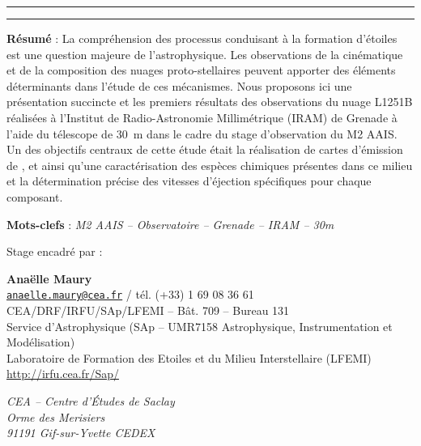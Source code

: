 \documentclass[a4paper,10pt,french]{article}
\begin{document}
\begin{center}

    \vspace{1.5cm}

    \rule[11pt]{5cm}{0.5pt}

    \textbf{\huge \thetitle}

    \rule{5cm}{0.5pt}

    \vspace{1.5cm}

    \parbox{15cm}{\textbf{Résumé} :
        La compréhension des processus conduisant à la formation d’étoiles est
        une question majeure de l’astrophysique. Les observations de la
        cinématique et de la composition des nuages proto-stellaires peuvent
        apporter des éléments déterminants dans l’étude de ces mécanismes. Nous
        proposons ici une présentation succincte et les premiers résultats des
        observations du nuage L1251B réalisées à l’Institut de Radio-Astronomie
        Millimétrique (IRAM) de Grenade à l’aide du télescope de
        \SI{30}{\meter} dans le cadre du stage d’observation du M2 AAIS. Un des
        objectifs centraux de cette étude était la réalisation de cartes
        d’émission de ,  et  ainsi qu’une
        caractérisation des espèces chimiques présentes dans ce milieu et la
        détermination précise des vitesses d’éjection spécifiques pour chaque
        composant.
    }

    \vspace{0.5cm}

    \parbox{15cm}{
        \textbf{Mots-clefs} : \it M2 AAIS – Observatoire – Grenade – IRAM – 30m
    }

    \vspace{0.5cm}

    \parbox{15cm}{
        Stage encadré par :

        \textbf{Anaëlle Maury} \\
        \href{mailto:anaelle.maury@cea.fr}{\tt anaelle.maury@cea.fr} / tél. (+33) 1 69 08 36 61 \\
        CEA/DRF/IRFU/SAp/LFEMI – Bât. 709 – Bureau 131 \\
        Service d’Astrophysique (SAp – UMR7158 Astrophysique, Instrumentation et Modélisation) \\
        Laboratoire de Formation des Etoiles et du Milieu Interstellaire (LFEMI) \\
        \url{http://irfu.cea.fr/Sap/}

        \textit{%
            CEA – Centre d’Études de Saclay \\
            Orme des Merisiers \\
            91191 Gif-sur-Yvette CEDEX
        }
    }


\end{center}
\end{document}
